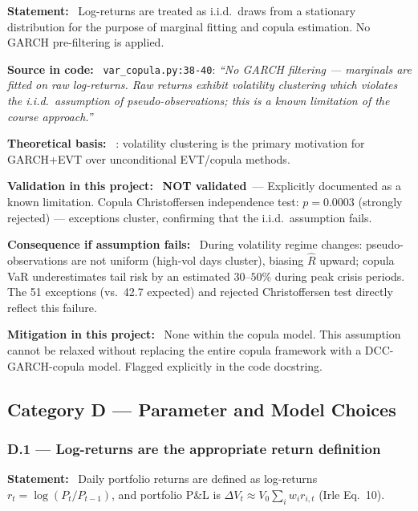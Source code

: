 \documentclass[11pt,a4paper]{article}
\newcommand{\asmfield}[1]{\medskip\noindent\textbf{#1:}\ }
\newcommand{\code}[1]{\texttt{#1}}
\newcommand{\notvalidated}{\textbf{NOT validated}}
\begin{document}
\asmfield{Statement}
Log-returns are treated as i.i.d.\ draws from a stationary distribution
for the purpose of marginal fitting and copula estimation. No GARCH
pre-filtering is applied.

\asmfield{Source in code}
\code{var\_copula.py:38-40}: \emph{``No GARCH filtering --- marginals are
fitted on raw log-returns. Raw returns exhibit volatility clustering which
violates the i.i.d.\ assumption of pseudo-observations; this is a known
limitation of the course approach.''}

\asmfield{Theoretical basis}
\cite{McNeilFrey2000}: volatility clustering is the primary motivation for
GARCH+EVT over unconditional EVT/copula methods.

\asmfield{Validation in this project}
\notvalidated\ --- Explicitly documented as a known limitation. Copula
Christoffersen independence test: $p = 0.0003$ (strongly rejected) ---
exceptions cluster, confirming that the i.i.d.\ assumption fails.

\asmfield{Consequence if assumption fails}
During volatility regime changes: pseudo-observations are not uniform (high-vol
days cluster), biasing $\hat{R}$ upward; copula VaR underestimates tail
risk by an estimated $30$--$50\%$ during peak crisis periods. The 51
exceptions (vs.\ 42.7 expected) and rejected Christoffersen test directly
reflect this failure.

\asmfield{Mitigation in this project}
None within the copula model. This assumption cannot be relaxed without
replacing the entire copula framework with a DCC-GARCH-copula model.
Flagged explicitly in the code docstring.

\subsection{Category D --- Parameter and Model Choices}\label{sec:catD}

\subsubsection{D.1 --- Log-returns are the appropriate return definition}\label{asm:D1}

\asmfield{Statement}
Daily portfolio returns are defined as log-returns $r_t = \log(P_t/P_{t-1})$,
and portfolio P\&L is $\Delta V_t \approx V_0 \sum_i w_i r_{i,t}$ (Irle
Eq.~10).
\end{document}
